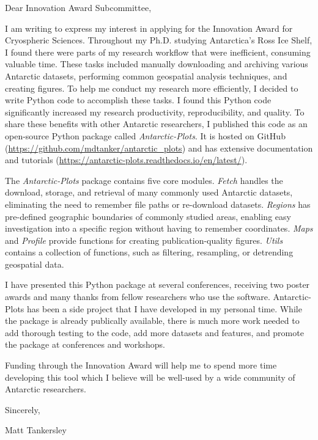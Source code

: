 \documentclass{ExpressiveCoverLetter}
\begin{document}
\coverletterheader[
    firstname=Matthew,
    middleinitial=D,
    lastname=Tankersley,
    email=matt.d.tankersley@gmail.com,
    linkedin=matthew-tankersley,
    github=mdtanker,
]
\vspace{-0.1in}


Dear Innovation Award Subcommittee,

I am writing to express my interest in applying for the Innovation Award
for Cryospheric Sciences.
Throughout my Ph.D. studying Antarctica's Ross Ice Shelf, I found there
were parts of my research workflow that were inefficient, consuming
valuable time. These tasks included manually downloading and archiving
various Antarctic datasets, performing common geospatial analysis
techniques, and creating figures.
To help me conduct my research more efficiently, I decided to write
Python code to accomplish these tasks.
I found this Python code significantly increased my research productivity, reproducibility, and quality.
To share these benefits with other Antarctic researchers, I published
this code as an open-source Python package called
\textit{Antarctic-Plots}.
It is hosted on GitHub
(\url{https://github.com/mdtanker/antarctic_plots}) and has extensive
documentation and tutorials (\url{https://antarctic-plots.readthedocs.io/en/latest/}).

The \textit{Antarctic-Plots} package contains five core modules.
\textit{Fetch} handles the download, storage, and retrieval of many
commonly used Antarctic datasets, eliminating the need to
remember file paths or re-download datasets. \textit{Regions} has
pre-defined geographic boundaries of commonly studied areas, enabling easy investigation into a
specific region without having to remember coordinates. \textit{Maps}
and \textit{Profile} provide functions for creating publication-quality
figures. \textit{Utils} contains a collection of functions, such as
filtering, resampling, or detrending geospatial data.

I have presented this Python package at several conferences, receiving
two poster awards and many thanks from fellow researchers who use the
software.
Antarctic-Plots has been a
side project that I have developed in my personal time. While the package
is already publically available, there is much more work needed to add
thorough testing to the code, add more datasets and features, and
promote the package at conferences and workshops.

Funding through the Innovation Award will help me to spend more time
developing this tool which I believe will be well-used by a wide
community of Antarctic researchers.

Sincerely,


Matt Tankersley
\end{document}
